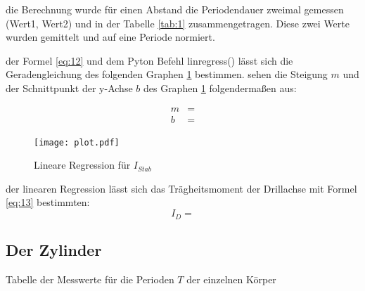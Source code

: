  die Berechnung wurde  für einen Abstand die Periodendauer zweimal gemessen (Wert1, Wert2) und in der Tabelle \ref{tab:1}
zusammengetragen. Diese zwei Werte wurden gemittelt und auf eine Periode normiert.

\justifying der Formel \eqref{eq:12} und dem Pyton Befehl linregress() \cite{numpy} lässt sich die Geradengleichung
des folgenden Graphen \ref{fig:1} bestimmen. 
\justifying sehen die Steigung $m$ und der Schnittpunkt der y-Achse $b$ des Graphen \ref{fig:1} folgendermaßen aus:

\begin{subequations}
\begin{align}
m &= \text{}\label{eq:17a}\\
b &= \text{}\label{eq:17b}
\end{align}
\end{subequations}

\begin{figure}[H]
    \centering
    \texttt{[image: plot.pdf]}
    \caption{Lineare Regression für $I_{Stab}$}
    \label{fig:1}
\end{figure}

\justifying der linearen Regression lässt sich das Trägheitsmoment der Drillachse mit Formel \eqref{eq:13} bestimmten:
\begin{equation}
I_D = \label{eq:18} %
\end{equation}

\subsection{Der Zylinder}\justifying %

\begin{table}[H]
    \centering
    
    \caption{Tabelle der Messwerte für die Perioden $T$ der einzelnen Körper}
    \label{tab:3}
\end{table}

